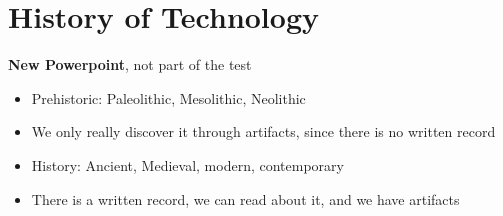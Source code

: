 \documentclass{article}
\begin{document}
\section{History of Technology}
\textbf{New Powerpoint}, not part of the test

\begin{itemize}
  \item Prehistoric: Paleolithic, Mesolithic, Neolithic
  \item We only really discover it through artifacts,
    since there is no written record
  \item History: Ancient, Medieval, modern, contemporary
  \item There is a written record, we can read
    about it, and we have artifacts
\end{itemize}
\end{document}

